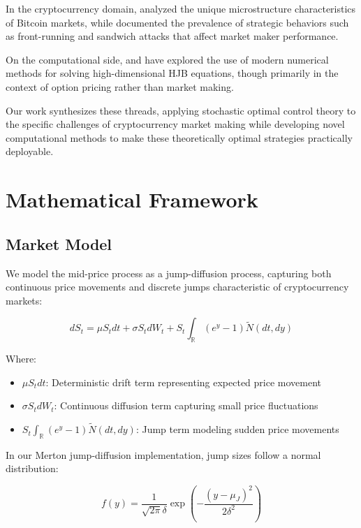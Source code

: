 \documentclass[onecolumn,ieee]{arithmaxresearch}
\begin{document}
In the cryptocurrency domain, \cite{lehalle2019incorporating} analyzed the unique microstructure characteristics of Bitcoin markets, while \cite{daian2020flash} documented the prevalence of strategic behaviors such as front-running and sandwich attacks that affect market maker performance.

On the computational side, \cite{reisinger2018numerical} and \cite{sirignano2019deep} have explored the use of modern numerical methods for solving high-dimensional HJB equations, though primarily in the context of option pricing rather than market making.

Our work synthesizes these threads, applying stochastic optimal control theory to the specific challenges of cryptocurrency market making while developing novel computational methods to make these theoretically optimal strategies practically deployable.
    
\section{Mathematical Framework}

\subsection{Market Model}

We model the mid-price process as a jump-diffusion process, capturing both continuous price movements and discrete jumps characteristic of cryptocurrency markets:

\begin{equation}
dS_t = \mu S_t dt + \sigma S_t dW_t + S_t \int_{\mathbb{R}} (e^y - 1) \tilde{N}(dt, dy)
\end{equation}

Where:
\begin{itemize}
    \item $\mu S_t dt$: Deterministic drift term representing expected price movement
    \item $\sigma S_t dW_t$: Continuous diffusion term capturing small price fluctuations
    \item $S_t \int_{\mathbb{R}} (e^y - 1) \tilde{N}(dt, dy)$: Jump term modeling sudden price movements
\end{itemize}

In our Merton jump-diffusion implementation, jump sizes follow a normal distribution:

\begin{equation}
f(y) = \frac{1}{\sqrt{2\pi}\delta} \exp\left(-\frac{(y-\mu_J)^2}{2\delta^2}\right)
\end{equation}
\end{document}
